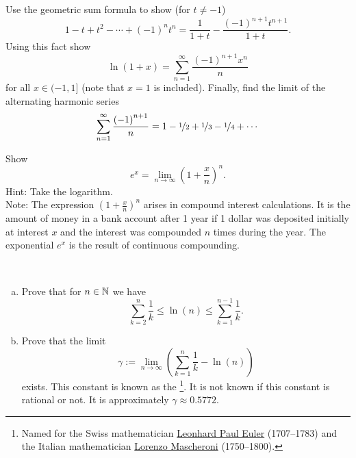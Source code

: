 \begin{exercise}
Use the geometric sum formula to show (for $t\not= -1$)
\begin{equation*}
1-t+t^2-\cdots+{(-1)}^n t^n = \frac{1}{1+t} - \frac{{(-1)}^{n+1}t^{n+1}}{1+t}.
\end{equation*}
Using this fact show
\begin{equation*}
\ln (1+x) = \sum_{n=1}^\infty \frac{{(-1)}^{n+1}x^n}{n} 
\end{equation*}
for all $x \in (-1,1]$ (note that $x=1$ is included).  Finally,
find the limit of the alternating harmonic series
\begin{equation*}
\sum_{n=1}^\infty \frac{{(-1)}^{n+1}}{n} = 1 - \nicefrac{1}{2} +
\nicefrac{1}{3} - \nicefrac{1}{4} + \cdots
\end{equation*}
\end{exercise}

\begin{exercise}
Show 
\begin{equation*}
e^x = \lim_{n\to\infty} {\left( 1 + \frac{x}{n} \right)}^n .
\end{equation*}
Hint: Take the logarithm.\\
Note: The expression 
${\left( 1 + \frac{x}{n} \right)}^n$ arises in compound interest
calculations.  It is the amount of money in a bank account after 1 year
if 1 dollar was deposited initially at interest $x$
and the interest was compounded $n$
times during the year.  The exponential $e^x$ is the result of continuous
compounding.
\end{exercise}

\begin{samepage}
\begin{exercise}
{\ }
\begin{enumerate}[a)]
\item
Prove that for $n \in {\mathbb{N}}$ we have
\begin{equation*}
\sum_{k=2}^{n}
\frac{1}{k}
\leq
\ln (n)
\leq
\sum_{k=1}^{n-1}
\frac{1}{k} .
\end{equation*}
\item
Prove that the limit
\begin{equation*}
\gamma := \lim_{n\to\infty}
\left( \sum_{k=1}^{n}
\frac{1}{k} - \ln (n) \right)
\end{equation*}
exists.  This constant is known as the
\emph{}%
\footnote{Named for the Swiss mathematician
\href{https://en.wikipedia.org/wiki/Leonhard_Euler}{Leonhard Paul Euler}
(1707--1783)
and the Italian mathematician
\href{https://en.wikipedia.org/wiki/Lorenzo_Mascheroni}{Lorenzo Mascheroni}
(1750--1800).}.  It is not known if this constant is rational or not.
It is approximately $\gamma \approx 0.5772$.
\end{enumerate}
\end{exercise}
\end{samepage}

